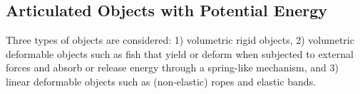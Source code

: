 \documentclass[conference]{IEEEtran}
\begin{document}


\subsection{Articulated Objects with Potential Energy}
Three types of objects are considered: 1) volumetric rigid objects, 2) volumetric deformable objects such as fish that yield or deform when subjected to external forces and absorb or release energy through a spring-like mechanism, and 3) linear deformable objects such as (non-elastic) ropes and elastic bands.
\end{document}

